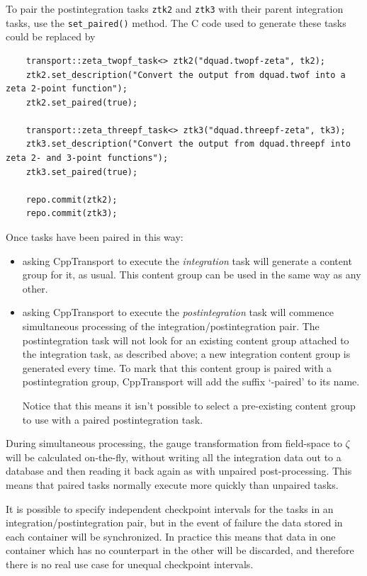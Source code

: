 \documentclass[11pt,a4paper]{article}
\newcommand{\packagefont}{\sffamily}
\newcommand{\CppTransport}{{\packagefont CppTransport}}
\newcommand{\semibold}[1]{{\fontseries{b}\selectfont{#1}}}
\newcommand{\para}[1]{\par\vspace{2mm}\noindent\semibold{{#1.}---}\ignorespaces}
\newcommand\CC{C\nolinebreak\hspace{-.05em}\raisebox{.4ex}{\relsize{-3}{\textbf{+}}}\nolinebreak\hspace{-.10em}\raisebox{.4ex}{\relsize{-3}{\textbf{+}}}}
\begin{document}
To pair
the postintegration tasks
\texttt{ztk2} and
\texttt{ztk3} with their parent integration tasks, use
the
\texttt{set_paired()} method.
The {\CC} code used to generate these tasks could be replaced by
\begin{verbatim}
    transport::zeta_twopf_task<> ztk2("dquad.twopf-zeta", tk2);
    ztk2.set_description("Convert the output from dquad.twof into a zeta 2-point function");
    ztk2.set_paired(true);

    transport::zeta_threepf_task<> ztk3("dquad.threepf-zeta", tk3);
    ztk3.set_description("Convert the output from dquad.threepf into zeta 2- and 3-point functions");
    ztk3.set_paired(true);

    repo.commit(ztk2);
    repo.commit(ztk3);
\end{verbatim}
Once tasks have been paired in this way:
\begin{itemize}
    \item asking {\CppTransport} to execute the \emph{integration} task will generate
    a content group for it, as usual. This content group can be used
    in the same way as any other.
    
    \item asking {\CppTransport} to execute the \emph{postintegration} task
    will commence simultaneous processing of the integration/postintegration pair.
    The postintegration task will not look for an existing content group
    attached to the integration task, as described above;
    a new integration content group is generated every time.
    To mark that this content group is paired with a postintegration group,
    {\CppTransport} will add the suffix `-paired' to its name.
    
    Notice that this means it isn't possible to select a pre-existing
    content group to use with a paired postintegration task.
\end{itemize}
During simultaneous processing, the gauge transformation from field-space
to $\zeta$ will be calculated on-the-fly, without writing all the integration data
out to a database and then reading it back again as with unpaired
post-processing. This means that paired tasks normally execute
more quickly than unpaired tasks.

\para{Task options}
It is possible to specify independent checkpoint intervals for the tasks
in an integration/postintegration pair, but in the event of failure
the data stored in each container will be synchronized.
In practice this means that data in one container which has no counterpart
in the other will be discarded,
and therefore there is no real use case for unequal checkpoint intervals.
\end{document}
